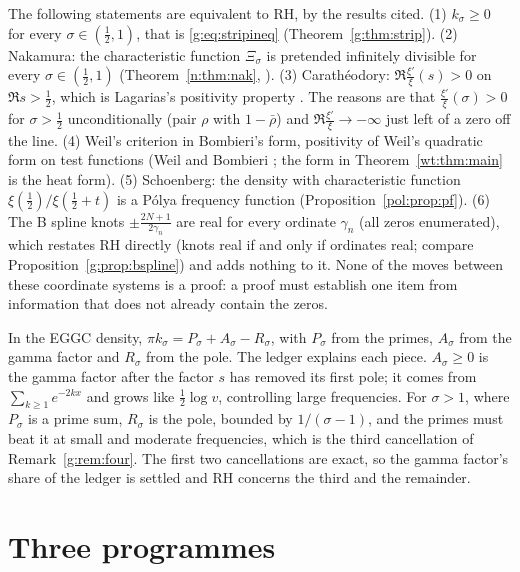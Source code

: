 \begin{remark}\label{g:rem:chain}
The following statements are equivalent to RH, by the results cited. (1) $k_\sigma\ge0$ for every $\sigma\in(\frac12,1)$, that is \eqref{g:eq:stripineq} (Theorem~\ref{g:thm:strip}). (2) Nakamura: the characteristic function $\Xi_\sigma$ is pretended infinitely divisible for every $\sigma\in(\frac12,1)$ (Theorem~\ref{n:thm:nak}, \cite{Nakamura15}). (3) Carath\'eodory: $\Re\frac{\xi'}{\xi}(s)>0$ on $\Re s>\frac12$, which is Lagarias's positivity property \cite{Lagarias}. The reasons are that $\frac{\xi'}{\xi}(\sigma)>0$ for $\sigma>\frac12$ unconditionally (pair $\rho$ with $1-\bar\rho$) and $\Re\frac{\xi'}{\xi}\to-\infty$ just left of a zero off the line. (4) Weil's criterion in Bombieri's form, positivity of Weil's quadratic form on test functions (Weil and Bombieri \cite{Bombieri}; the form in Theorem~\ref{wt:thm:main} is the heat form). %
 (5) Schoenberg: the density with characteristic function $\xi(\frac12)/\xi(\frac12+t)$ is a P\'olya frequency function (Proposition~\ref{pol:prop:pf}). (6) The B spline knots $\pm\frac{2N+1}{2\gamma_n}$ are real for every ordinate $\gamma_n$ (all zeros enumerated), which restates RH directly (knots real if and only if ordinates real; compare Proposition~\ref{g:prop:bspline}) and adds nothing to it. None of the moves between these coordinate systems is a proof: a proof must establish one item from information that does not already contain the zeros.
\end{remark}

In the EGGC density, $\pi k_\sigma=P_\sigma+A_\sigma-R_\sigma$, with $P_\sigma$ from the primes, $A_\sigma$ from the gamma factor and $R_\sigma$ from the pole. The ledger explains each piece. $A_\sigma\ge0$ is the gamma factor after the factor $s$ has removed its first pole; it comes from $\sum_{k\ge1}e^{-2kx}$ and grows like $\frac12\log v$, controlling large frequencies. For $\sigma>1$, where $P_\sigma$ is a prime sum, $R_\sigma$ is the pole, bounded by $1/(\sigma-1)$, and the primes must beat it at small and moderate frequencies, which is the third cancellation of Remark~\ref{g:rem:four}. The first two cancellations are exact, so the gamma factor's share of the ledger is settled and RH concerns the third and the remainder.

\section{Three programmes}\label{g:sec:pathgp}

